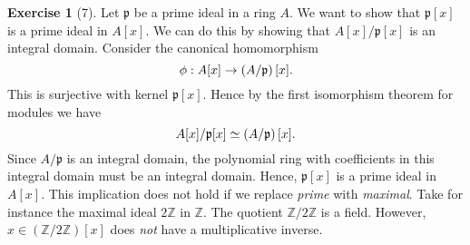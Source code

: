 \documentclass{article}
\theoremstyle{definition}
\newtheorem*{exercise}{Exercise}
\begin{document}
\begin{exercise}[7]
    Let $\mathfrak{p}$ be a prime ideal in a ring $A$. We want to show that
    $\mathfrak{p}[x]$ is a prime ideal in $A[x]$. We can do this by showing
    that $A[x] / \mathfrak{p}[x]$ is an integral domain. Consider the canonical
    homomorphism
    \begin{equation}
        \notag
        \phi : A[x] \to \left(A / \mathfrak{p}\right)[x].
    \end{equation}
    This is surjective with kernel $\mathfrak{p}[x]$. Hence by the first
    isomorphism theorem for modules we have
    \begin{equation}
        \notag
        A[x] / \mathfrak{p}[x] \simeq \left( A / \mathfrak{p} \right)[x].
    \end{equation}
    Since $A / \mathfrak{p}$ is an integral domain, the polynomial ring with
    coefficients in this integral domain must be an integral domain. Hence,
    $\mathfrak{p}[x]$ is a prime ideal in $A[x]$.  This implication does not
    hold if we replace \emph{prime} with \emph{maximal}. Take for instance the
    maximal ideal $2\mathbb{Z}$ in $\mathbb{Z}$. The quotient $\mathbb{Z} /
    2\mathbb{Z}$ is a field. However, $x \in
    \left(\mathbb{Z}/2\mathbb{Z}\right)[x]$ does \emph{not} have a
    multiplicative inverse.
\end{exercise}
\end{document}
